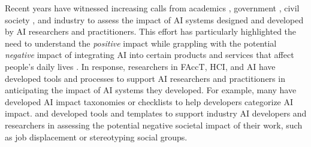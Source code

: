 Recent years have witnessed increasing calls from academics \cite{kieslich2023anticipating, hecht2021s, bernstein2021ethics, Neurips2020workshop, Neurips2020blog, CVPR2023EthicsGuidelines, ACL2023ethicspolicy, ICML2023EthicsGuidelines, olteanu2023responsible, ESR_Stanford}, government \cite{AIA_Adalove, NAIRRTF2023FinalReport, NAIRRTF2023Strengthening}, civil society \cite{PAI2021managing, ada2022looking, AIA_Adalove, AIML_Data_Society, metcalf2021algorithmic, reisman2018algorithmic}, and industry \cite{RAIIAguide_MSFT, RAIIAtemplate_MSFT, googleRAI, openAI_research, hecht2021s, deng2024supporting} to assess the impact of AI systems designed and developed by AI researchers and practitioners. This effort has particularly highlighted the need to understand the \textit{positive} impact while grappling with the potential \textit{negative} impact of integrating AI into certain products and services that affect people's daily lives \cite{Neurips2020workshop, Neurips2020blog, hecht2021s}. 
In response, researchers in FAccT, HCI, and AI have developed tools and processes to support AI researchers and practitioners in anticipating the impact of AI systems they developed\citep{wang2024farsight, kieslich2023anticipating, buccinca2023aha, deng2024supporting, weidinger2022taxonomy}. For example, many have developed AI impact taxonomies or checklists to help developers categorize AI impact\citep{weidinger2022taxonomy, RAIIAtemplate_MSFT}. \citeauthor{wang2024farsight} and \citeauthor{deng2024supporting} developed tools and templates to support industry AI developers and researchers in assessing the potential negative societal impact of their work, such as job displacement or stereotyping social groups. 

